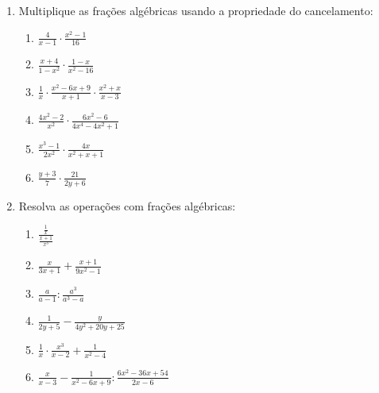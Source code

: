 \begin{description}
\begin{enumerate}[label=\textbf{\thesubsection.\arabic*}~~~~]
    \item Multiplique as frações algébricas usando a propriedade do cancelamento:
    
    \begin{multicols}{3}{\large
        \begin{enumerate} [label=\alph*)]
            \item $\frac{4}{x-1} \cdot \frac{x^2-1}{16}$
            
            \item $\frac{x+4}{1-x^2} \cdot \frac{1-x}{x^2-16}$
            
            \item $\frac{1}{x} \cdot \frac{x^2-6x+9}{x+1} \cdot \frac{x^2+x}{x-3}$
            
            \item $\frac{4x^2-2}{x^2} \cdot \frac{6x^2-6}{4x^4-4x^2+1}$
            
            \item $\frac{x^3-1}{2x^2} \cdot \frac{4x}{x^2+x+1}$
            
            \item $\frac{y+3}{7} \cdot \frac{21}{2y+6}$
        \end{enumerate}
    }\end{multicols}
    
    \item Resolva as operações com frações algébricas:
    
    \begin{multicols}{2}{\large
        \begin{enumerate} [label=\alph*)]
            \item {\Large $\frac{\frac{1}{x}}{\frac{x+1}{x^3}}$}
            
            \item $\frac{x}{3x+1} + \frac{x+1}{9x^2-1}$
            
            \item $\frac{a}{a-1} : \frac{a^3}{a^3-a}$
            
            \item $\frac{1}{2y+5} - \frac{y}{4y^2+20y+25}$
            
            \item $\frac{1}{x} \cdot \frac{x^3}{x-2} + \frac{1}{x^2-4}$
            
            \item $\frac{x}{x-3} - \frac{1}{x^2-6x+9} : \frac{6x^2-36x+54}{2x-6}$
        \end{enumerate}
    }\end{multicols}
    
\end{enumerate}
\end{description}

